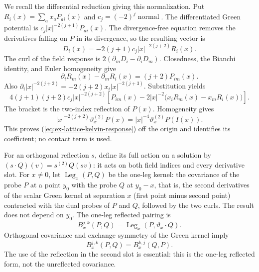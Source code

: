 We recall the differential reduction giving this normalization. Put
$R_i(x)=\sum_a x_aP_{ai}(x)$ and
$c_j=(-2)^j\operatorname{normal}$. The differentiated Green potential is
$c_j|x|^{-2(j+1)}P_{ai}(x)$. The divergence-free equation removes the
derivatives falling on $P$ in its divergence, so the resulting vector is
\[
 D_i(x)=-2(j+1)c_j|x|^{-2(j+2)}R_i(x).
\]
The curl of the field response is
$2(\partial_mD_i-\partial_iD_m)$. Closedness, the Bianchi identity, and
Euler homogeneity give
\[
 \partial_iR_m(x)-\partial_mR_i(x)=(j+2)P_{im}(x).
\]
Also $\partial_i|x|^{-2(j+2)}=-2(j+2)x_i|x|^{-2(j+3)}$. Substitution
yields
\[
 4(j+1)(j+2)c_j|x|^{-2(j+2)}
 \left[
   P_{im}(x)-2|x|^{-2}\bigl(x_iR_m(x)-x_mR_i(x)\bigr)
 \right].
\]
The bracket is the two-index reflection of $P(x)$. Homogeneity gives
\[
 |x|^{-2(j+2)}\vartheta_x^{(2)}P(x)
   =|x|^{-4}\vartheta_x^{(2)}P(I(x)).
\]
This proves
(\ref{eq:ex-lattice-kelvin-response}) off the origin and identifies its
coefficient; no contact term is used.

For an orthogonal reflection $s$, define its full action on a solution by
$(s\cdot Q)(v)=s^{(2)}Q(sv)$: it acts on both field indices and every
derivative slot. For $x\ne0$, let $\operatorname{Leg}_x(P,Q)$ be the
one-leg kernel: the covariance of the probe $P$ at a point $y_0$ with the
probe $Q$ at $y_0-x$, that is, the second derivatives of the scalar Green
kernel at separation $x$ (first point minus second point) contracted with
the dual probes of $P$ and $Q$, followed by the two curls.  The result does
not depend on $y_0$. The one-leg reflected pairing is
\[
 B_x^{j,k}(P,Q)=\operatorname{Leg}_x(P,\vartheta_x\cdot Q).
\]
Orthogonal covariance and exchange symmetry of the Green kernel imply
\[
 B_x^{j,k}(P,Q)=B_x^{k,j}(Q,P).
\]
The use of the reflection in the second slot is essential: this is the
one-leg reflected form, not the unreflected covariance.

